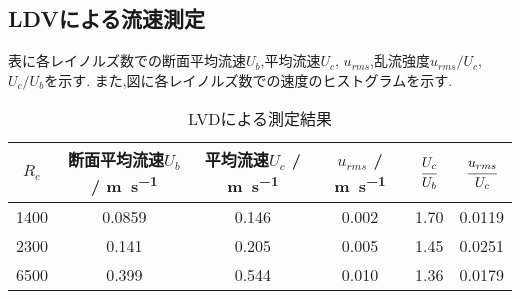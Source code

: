 \subsection{LDVによる流速測定}
表に各レイノルズ数での断面平均流速$U_b$,平均流速$U_c$, $u_{rms}$,乱流強度$u_{rms}/U_c$, $U_c/U_b$を示す.
また,図に各レイノルズ数での速度のヒストグラムを示す.
\begin{table}[htbp]
   \caption{LVDによる測定結果}
   \label{tab:LVD}
   \centering
   \begin{tabular}{cccccc}
     \hline
     $R_e$&断面平均流速$U_b$ / \si{\metre.\second^{-1}}&平均流速$U_c$ / \si{\metre.\second^{-1}}&$u_{rms}$ / \si{\metre.\second^{-1}}&$\cfrac{U_c}{U_b}$&$\cfrac{u_{rms}}{U_c}$\\
     \hline \hline
     1400 & 0.0859  & 0.146 & 0.002 & 1.70 & 0.0119 \\
2300 & 0.141  & 0.205 & 0.005 & 1.45 & 0.0251 \\
6500 & 0.399  & 0.544 & 0.010 & 1.36 & 0.0179 \\
     \hline
   \end{tabular}
\end{table}
